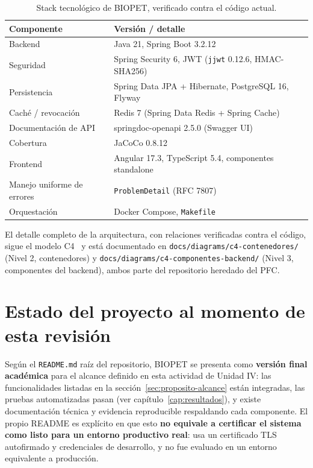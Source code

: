 \begin{table}[H]
  \centering
  \caption{Stack tecnol\'ogico de BIOPET, verificado contra el c\'odigo actual.}
  \label{tab:stack-tecnologico}
  \begin{tabular}{@{}lp{8cm}@{}}
    \toprule
    Componente & Versi\'on / detalle \\
    \midrule
    Backend & Java 21, Spring Boot 3.2.12~\parencite{spring-boot-docs} \\
    Seguridad & Spring Security 6, JWT (\texttt{jjwt} 0.12.6, HMAC-SHA256)~\parencite{rfc7519} \\
    Persistencia & Spring Data JPA + Hibernate, PostgreSQL 16, Flyway \\
    Cach\'e / revocaci\'on & Redis 7 (Spring Data Redis + Spring Cache) \\
    Documentaci\'on de API & springdoc-openapi 2.5.0 (Swagger UI)~\parencite{openapi-spec} \\
    Cobertura & JaCoCo 0.8.12 \\
    Frontend & Angular 17.3, TypeScript 5.4, componentes standalone~\parencite{angular-docs} \\
    Manejo uniforme de errores & \texttt{ProblemDetail} (RFC 7807)~\parencite{rfc7807} \\
    Orquestaci\'on & Docker Compose, \texttt{Makefile} \\
    \bottomrule
  \end{tabular}
\end{table}


El detalle completo de la arquitectura, con relaciones verificadas contra
el c\'odigo, sigue el modelo C4~\parencite{c4-model} y est\'a documentado en
\texttt{docs/diagrams/c4-contenedores/} (Nivel 2, contenedores) y
\texttt{docs/diagrams/c4-componentes-backend/} (Nivel 3, componentes del
backend), ambos parte del repositorio heredado del PFC.

\section{Estado del proyecto al momento de esta revisi\'on}
\label{sec:estado-proyecto}

Seg\'un el \texttt{README.md} ra\'iz del repositorio, BIOPET se presenta
como \textbf{versi\'on final acad\'emica} para el alcance definido en esta
actividad de Unidad IV: las funcionalidades listadas en la
secci\'on~\ref{sec:proposito-alcance} est\'an integradas, las pruebas
automatizadas pasan (ver cap\'itulo~\ref{cap:resultados}), y existe
documentaci\'on t\'ecnica y evidencia reproducible respaldando cada
componente. El propio README es expl\'icito en que esto \textbf{no
equivale a certificar el sistema como listo para un entorno productivo
real}: usa un certificado TLS autofirmado y credenciales de desarrollo, y
no fue evaluado en un entorno equivalente a producci\'on.
